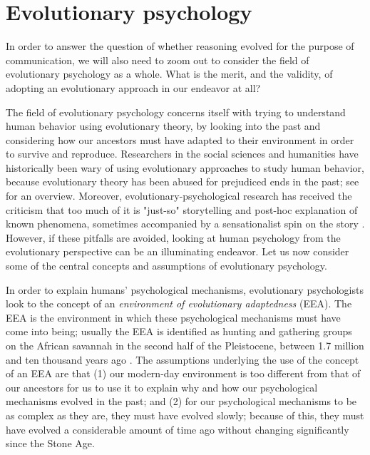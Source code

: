 \section{Evolutionary psychology}
\label{sec:evol-psych}
In order to answer the question of whether reasoning evolved for the purpose of communication, we will also need to zoom out to consider the field of evolutionary psychology as a whole.
What is the merit, and the validity, of adopting an evolutionary approach in our endeavor at all?

The field of evolutionary psychology concerns itself with trying to understand human behavior using evolutionary theory, by looking into the past and considering how our ancestors must have adapted to their environment in order to survive and reproduce.
Researchers in the social sciences and humanities have historically been wary of using evolutionary approaches to study human behavior, because evolutionary theory has been abused for prejudiced ends in the past; see \citet[pp.~19--20]{LB02} for an overview. Moreover, evolutionary-psychological research has received the criticism that too much of it is "just-so" storytelling and post-hoc explanation of known phenomena, sometimes accompanied by a sensationalist spin on the story \citep{LB02}.
However, if these pitfalls are avoided, looking at human psychology from the evolutionary perspective can be an illuminating endeavor.
Let us now consider some of the central concepts and assumptions of evolutionary psychology.

In order to explain humans' psychological mechanisms, evolutionary psychologists look to the concept of an \emph{environment of evolutionary adaptedness} (EEA). The EEA is the environment in which these psychological mechanisms must have come into being; usually the EEA is identified as hunting and gathering groups on the African savannah in the second half of the Pleistocene, between 1.7 million and ten thousand years ago \citep{LB02}. 
The assumptions underlying the use of the concept of an EEA are that (1) our modern-day environment is too different from that of our ancestors for us to use it to explain why and how our psychological mechanisms evolved in the past; and (2) for our psychological mechanisms to be as complex as they are, they must have evolved slowly; because of this, they must have evolved a considerable amount of time ago without changing significantly since the Stone Age.

